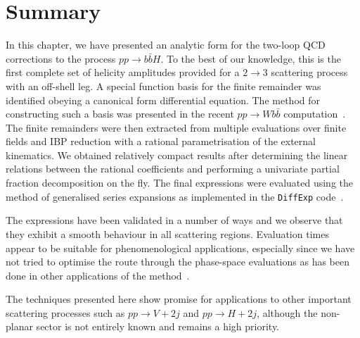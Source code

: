 \documentclass[main.tex]{subfiles}
\begin{document}
\section{Summary}
\label{Hbbsec:conclusions}

In this chapter, we have presented an analytic form for the two-loop QCD corrections to the process
$pp\to b\bar{b}H$. To the best of our knowledge, this is the first complete set of helicity
amplitudes provided for a $2\to 3$ scattering process with an off-shell leg. A special function basis for
the finite remainder was identified obeying a canonical form differential equation. The method for
constructing such a basis was presented in the recent $pp\to Wb\bar{b}$ computation~\cite{Badger:2021nhg}. The finite remainders were then extracted from multiple
evaluations over finite fields and IBP reduction with a rational parametrisation of the external kinematics.
We obtained relatively compact results after determining the linear relations between the rational coefficients and
performing a univariate partial fraction decomposition on the fly. The final expressions were evaluated using the method of generalised series expansions as implemented in the \texttt{DiffExp} code~\cite{Hidding:2020ytt}.

The expressions have been validated in a number of ways and we observe that they exhibit a smooth behaviour in all
scattering regions. Evaluation times appear to be suitable for phenomenological applications,
especially since we have not tried to optimise the route through the phase-space evaluations as has
been done in other applications of the method~\cite{Frellesvig:2019byn,Abreu:2020jxa,Becchetti:2020wof,Bonciani:2021zzf,abreu2021twoloop}.

The techniques presented here show promise for applications to other important scattering processes such
as $pp\to V+2j$ and $pp\to H+2j$, although the non-planar sector is not entirely known and remains a high priority.
\end{document}
